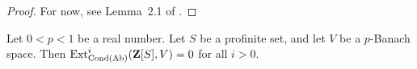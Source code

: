 \begin{proof}
  For now, see Lemma~2.1 of \cite{Analytic}.
\end{proof}

\begin{lemma}
  \label{Ext-free}
  Let $0 < p < 1$ be a real number.
  Let $S$ be a profinite set, and let $V$ be a $p$-Banach space.
  Then $\operatorname{Ext}_{\operatorname{Cond}(\operatorname{Ab})}^i(\mathbf{Z}[S], V) = 0$ for all $i > 0$.
\end{lemma}

